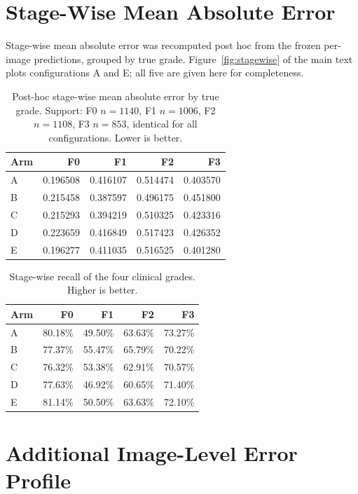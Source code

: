 \documentclass[journal]{IEEEtran}
\begin{document}
\section{Stage-Wise Mean Absolute Error}

Stage-wise mean absolute error was recomputed post hoc from the frozen per-image
predictions, grouped by true grade. Figure~\ref{fig:stagewise} of the main text
plots configurations A and E; all five are given here for completeness.

\begin{table}[!t]
\centering
\caption{Post-hoc stage-wise mean absolute error by true grade. Support:
F0 $n=1140$, F1 $n=1006$, F2 $n=1108$, F3 $n=853$, identical for all
configurations. Lower is better.}
\label{tab:stagemae}
\small
\begin{tabular}{@{}l rrrr@{}}
\toprule
Arm & F0 & F1 & F2 & F3 \\
\midrule
A & 0.196508 & 0.416107 & 0.514474 & 0.403570 \\
B & 0.215458 & 0.387597 & 0.496175 & 0.451800 \\
C & 0.215293 & 0.394219 & 0.510325 & 0.423316 \\
D & 0.223659 & 0.416849 & 0.517423 & 0.426352 \\
E & 0.196277 & 0.411035 & 0.516525 & 0.401280 \\
\bottomrule
\end{tabular}
\end{table}

\begin{table}[!t]
\centering
\caption{Stage-wise recall of the four clinical grades. Higher is better.}
\label{tab:stagerec}
\small
\begin{tabular}{@{}l rrrr@{}}
\toprule
Arm & F0 & F1 & F2 & F3 \\
\midrule
A & 80.18\% & 49.50\% & 63.63\% & 73.27\% \\
B & 77.37\% & 55.47\% & 65.79\% & 70.22\% \\
C & 76.32\% & 53.38\% & 62.91\% & 70.57\% \\
D & 77.63\% & 46.92\% & 60.65\% & 71.40\% \\
E & 81.14\% & 50.50\% & 63.63\% & 72.10\% \\
\bottomrule
\end{tabular}
\end{table}

\section{Additional Image-Level Error Profile}
\end{document}
